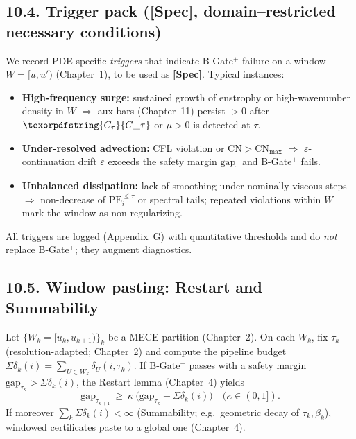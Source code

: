 \documentclass[11pt]{article}
\DeclareRobustCommand{\hyp}{\nobreakdash-}
\numberwithin{equation}{section}
\theoremstyle{definition}
\DeclareRobustCommand{\Ctau}{\texorpdfstring{\ensuremath{C_{\tau}}}{C\_\tau}}
\begin{document}
\subsection*{10.4. Trigger pack ([Spec], domain--restricted necessary conditions)}
We record PDE\hyp specific \emph{triggers} that indicate B\hyp Gate\(^{+}\) failure on a window \(W=[u,u')\) (Chapter~1), to be used as \textbf{[Spec]}. Typical instances:
\begin{itemize}
  \item \textbf{High\hyp frequency surge:} sustained growth of enstrophy or high\hyp wavenumber density in \(W\) \(\Rightarrow\) aux\hyp bars (Chapter~11) persist \(>0\) after \(\Ctau\) or \(\mu>0\) is detected at \(\tau\).
  \item \textbf{Under\hyp resolved advection:} CFL violation or \(\mathrm{CN}>\mathrm{CN}_{\max}\) \(\Rightarrow\) \(\varepsilon\)\hyp continuation drift \(\varepsilon\) exceeds the safety margin \(\mathrm{gap}_\tau\) and B\hyp Gate\(^{+}\) fails.
  \item \textbf{Unbalanced dissipation:} lack of smoothing under nominally viscous steps \(\Rightarrow\) non\hyp decrease of \(\mathrm{PE}_i^{\le\tau}\) or spectral tails; repeated violations within \(W\) mark the window as non\hyp regularizing.
\end{itemize}
All triggers are logged (Appendix~G) with quantitative thresholds and do \emph{not} replace B\hyp Gate\(^{+}\); they augment diagnostics.

\subsection*{10.5. Window pasting: Restart and Summability}
Let \(\{W_k=[u_k,u_{k+1})\}_k\) be a MECE partition (Chapter~2). On each \(W_k\), fix \(\tau_k\) (resolution\hyp adapted; Chapter~2) and compute the pipeline budget \(\Sigma\delta_k(i)=\sum_{U\in W_k}\delta_U(i,\tau_k)\). If B\hyp Gate\(^{+}\) passes with a safety margin \(\mathrm{gap}_{\tau_k}>\Sigma\delta_k(i)\), the Restart lemma (Chapter~4) yields
\[
\mathrm{gap}_{\tau_{k+1}}\ \ge\ \kappa\ \bigl(\mathrm{gap}_{\tau_k}-\Sigma\delta_k(i)\bigr)\quad(\kappa\in(0,1]).
\]
If moreover \(\sum_k\Sigma\delta_k(i)<\infty\) (Summability; e.g.\ geometric decay of \(\tau_k,\beta_k\)), windowed certificates paste to a global one (Chapter~4).
\end{document}
